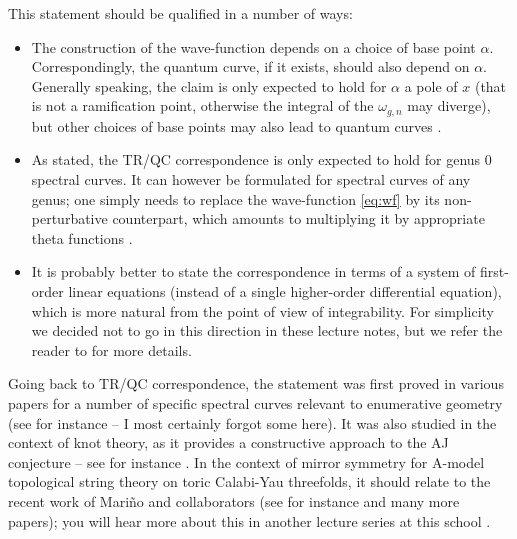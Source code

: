 \documentclass[reqno,oneside,11pt]{amsart}
\theoremstyle{plain}
\theoremstyle{definition}
\theoremstyle{remark}
\numberwithin{equation}{section}
\begin{document}
This statement should be qualified in a number of ways:
\begin{itemize}
\item The construction of the wave-function depends on a choice of base point $\alpha$. Correspondingly, the quantum curve, if it  exists, should also depend on $\alpha$. Generally speaking, the claim is only expected to hold for $\alpha$ a pole of $x$ (that is not a ramification point, otherwise the integral of the $\omega_{g,n}$ may diverge), but other choices of base points may also lead to quantum curves \cite{BE17}.
\item As stated, the TR/QC correspondence is only expected to hold for genus 0 spectral curves. It can however be formulated for spectral curves of any genus; one simply needs to replace the wave-function \eqref{eq:wf} by its non-perturbative counterpart, which amounts to multiplying it by appropriate theta functions \cite{EM08,EGMO21}. 
\item It is probably better to state the correspondence in terms of a system of first-order linear equations (instead of a single higher-order differential equation), which is more natural from the point of view of integrability. For simplicity we decided not to go in this direction in these lecture notes, but we refer the reader to \cite{BE11,MO19,EGMO21} for more details. 
\end{itemize}

Going back to TR/QC correspondence, the statement was first proved in various papers for a number of specific spectral curves relevant to enumerative geometry (see for instance \cite{BE09,BHLM13,DDM14,DM13,DN14,DM14,DM13b,DMNPS13,LMS13,MSS13,MS12,IKT18,IKT18b,MO19} -- I most certainly forgot some here). It was also studied in the context of knot theory, as it provides a constructive approach to the AJ conjecture \cite{Ga03} -- see for instance  \cite{DFM10,BE12,AFGS12,GS11}. In the context of mirror symmetry for A-model topological string theory on toric Calabi-Yau threefolds, it should relate to the recent work of Mari\~no and collaborators (see for instance \cite{GM22,IM23} and many more papers); you will hear more about this in another lecture series at this school \cite{Ma24}. 
\end{document}
